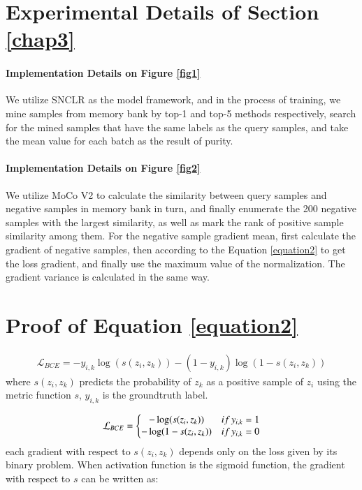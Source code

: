 \documentclass[review]{elsarticle}
\begin{document}
\begin{appendix}
\section{Experimental Details of Section \ref{chap3}}
\label{app2}
\paragraph{Implementation Details on Figure \ref{fig1}} We utilize SNCLR\cite{b15} as the model framework, and in the process of training, we mine samples from memory bank by top-1 and top-5 methods respectively, search for the mined samples that have the same labels as the query samples, and take the mean value for each batch as the result of purity.
\paragraph{Implementation Details on Figure \ref{fig2}}We utilize MoCo V2\cite{b7} to calculate the similarity between query samples and negative samples in memory bank in turn,  and finally enumerate the 200 negative samples with the largest similarity, as well as mark the rank of positive sample similarity among them. For the negative sample gradient mean, first calculate the gradient of negative samples, then according to the Equation \ref{equation2} to get the loss gradient, and finally use the maximum value of the normalization. The gradient variance is calculated in the same way. 


\section{Proof of Equation \ref{equation2}  }
\label{app1}
\begin{equation}
\begin{aligned}
\mathcal{L} _{BCE}=-y_{i,k}\log (s(z_i,z_k))-(1-y_{i,k})\log(1-s(z_i,z_k))
\end{aligned}
\end{equation}
where $s(z_i,z_k)$ predicts the probability of $z_k$ as a positive sample of $z_i$  using the metric function $s$, $y_{i,k}$ is the groundtruth label.

\begin{equation}
\begin{aligned}
\mathcal{L} _{BCE}= 
\left\{\begin{matrix}
 -\log (s(z_i,z_k))   & if  \thinspace  y_{i,k}=1
 \\ 
 -\log (1-s(z_i,z_k))  & if  \thinspace   y_{i,k}=0  
\end{matrix}\right.
\end{aligned}
\end{equation}
each gradient with respect to $s(z_i,z_k)$ depends only on the loss given by its binary problem. When activation function is the sigmoid function, the gradient with respect to $s$ can be written as:



\end{appendix}
\end{document}
